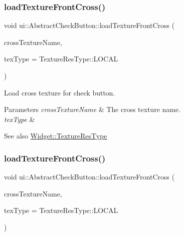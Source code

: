 \subsubsection{\texorpdfstring{load\+Texture\+Front\+Cross()}{loadTextureFrontCross()}\hspace{0.1cm}{\footnotesize\ttfamily [1/2]}}
{\footnotesize\ttfamily void ui\+::\+Abstract\+Check\+Button\+::load\+Texture\+Front\+Cross (\begin{DoxyParamCaption}\item[{const std\+::string \&}]{cross\+Texture\+Name,  }\item[{\hyperlink{classui_1_1Widget_a040a65ec5ad3b11119b7e16b98bd9af0}{Texture\+Res\+Type}}]{tex\+Type = {\ttfamily TextureResType\+:\+:LOCAL} }\end{DoxyParamCaption})}

Load cross texture for check button.


\begin{DoxyParams}{Parameters}
{\em cross\+Texture\+Name} & The cross texture name. \\
\hline
{\em tex\+Type} & \\
\hline
\end{DoxyParams}
\begin{DoxySeeAlso}{See also}
{\ttfamily \hyperlink{classui_1_1Widget_a040a65ec5ad3b11119b7e16b98bd9af0}{Widget\+::\+Texture\+Res\+Type}} 
\end{DoxySeeAlso}
\mbox{\label{classui_1_1AbstractCheckButton_a8a94e8e135a5e8d1d0be187d77970323}} 
\subsubsection{\texorpdfstring{load\+Texture\+Front\+Cross()}{loadTextureFrontCross()}\hspace{0.1cm}{\footnotesize\ttfamily [2/2]}}
{\footnotesize\ttfamily void ui\+::\+Abstract\+Check\+Button\+::load\+Texture\+Front\+Cross (\begin{DoxyParamCaption}\item[{const std\+::string \&}]{cross\+Texture\+Name,  }\item[{\hyperlink{classui_1_1Widget_a040a65ec5ad3b11119b7e16b98bd9af0}{Texture\+Res\+Type}}]{tex\+Type = {\ttfamily TextureResType\+:\+:LOCAL} }\end{DoxyParamCaption})}


